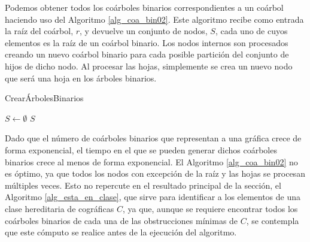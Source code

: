 Podemos obtener todos los coárboles binarios correspondientes a un coárbol
haciendo uso del Algoritmo \ref{alg_coa_bin02}. Este algoritmo recibe como
entrada la raíz del coárbol, $r$, y devuelve un conjunto de nodos, $S$, cada uno
de cuyos elementos es la raíz de un coárbol binario. Los nodos internos son
procesados creando un nuevo coárbol binario para cada posible partición del
conjunto de hijos de dicho nodo. Al procesar las hojas, simplemente se crea un
nuevo nodo que será una hoja en los árboles binarios. 

\begin{algorithm}[ht!]
\caption{CrearÁrbolesBinarios}
\label{alg_coa_bin02}
\DontPrintSemicolon %

$S \gets \emptyset$\;
\Return $S$\;
    
\end{algorithm}

Dado que el número de coárboles binarios que representan a una gráfica crece de forma exponencial, el tiempo en el que se pueden generar dichos coárboles binarios crece al menos de forma exponencial. El Algoritmo \ref{alg_coa_bin02} no es óptimo, ya que todos los nodos con excepción de la raíz y las hojas se procesan múltiples veces. Esto no repercute en el resultado principal de la sección, el Algoritmo \ref{alg_esta_en_clase}, que sirve para identificar a los elementos de una clase hereditaria de cográficas $C$, ya que, aunque se requiere encontrar todos los coárboles binarios de cada una de las obstrucciones mínimas de $C$, se contempla que este cómputo se realice antes de la ejecución del algoritmo.